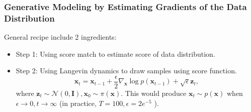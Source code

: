 \documentclass[10pt,xcolor={usenames,dvipsnames,table}]{beamer}
\begin{document}
\begin{frame}
    \frametitle{Generative Modeling by Estimating Gradients of the Data Distribution}
    General recipe include 2 ingredients:
    \begin{itemize}
        \item Step 1: Using score match to estimate score of data distribution.
        \item Step 2: Using Langevin dynamics to draw samples using score function.
            \[
            \bm{x}_t = \bm{x}_{t-1} + \dfrac{\epsilon}{2} \nabla_{\bm{x}} \log p(\bm{x}_{t-1}) + \sqrt{\epsilon} \bm{z}_t,
            \] 
            where $\bm{z}_t \sim \mathcal{N}(0, \bm{I}), \bm{x}_0 \sim \pi(\bm{x})$. This would produce $\bm{x}_{t} \sim p(\bm{x})$ when $\epsilon \to 0, t \to \infty$ (in practice, $T=100, \epsilon = 2e^{-5}$ ).
    \end{itemize}

\end{frame}
\end{document}
